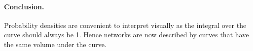 \paragraph{Conclusion.}Probability densities are convenient to interpret visually as the integral over the curve should always be 1. Hence networks are now described by curves that have the same volume under the curve. 

